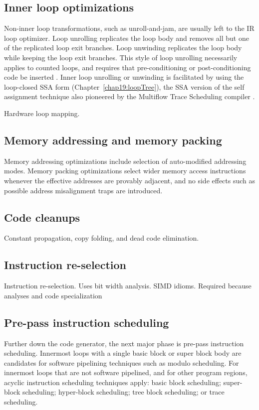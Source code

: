 \subsection{Inner loop optimizations}

Non-inner loop transformations, such as
unroll-and-jam, are usually left to the IR loop optimizer. Loop unrolling
replicates the loop body and removes all but one of the replicated loop exit
branches. Loop unwinding replicates the loop body while keeping the loop exit
branches. This style of loop unrolling necessarily applies to counted loops, and
requires that pre-conditioning or post-conditioning code be inserted
\cite{Lownet:1992:JS}. Inner loop unrolling or unwinding is facilitated by using
the loop-closed SSA form (Chapter~\ref{chap19:loopTree}), the SSA version of the
self assignment technique also pioneered by the Multiflow Trace Scheduling
compiler \cite{Lownet:1992:JS}.

Hardware loop mapping.

\subsection{Memory addressing and memory packing}

Memory addressing optimizations include selection of auto-modified addressing
modes. Memory packing optimizations select wider memory access instructions
whenever the effective addresses are provably adjacent, and no side effects such
as possible address misalignment traps are introduced.

\subsection{Code cleanups}

Constant propagation, copy folding, and dead code elimination.

\subsection{Instruction re-selection}

Instruction re-selection. Uses bit width analysis. SIMD idioms.
Required because analyses and code specialization

\subsection{Pre-pass instruction scheduling}

Further down the code generator, the next major phase is pre-pass instruction
scheduling. Innermost loops with a single basic block or super block body are
candidates for software pipelining techniques such as modulo scheduling. For
innermost loops that are not software pipelined, and for other program regions,
acyclic instruction scheduling techniques apply: basic block scheduling;
super-block scheduling; hyper-block scheduling; tree block scheduling; or trace
scheduling.

